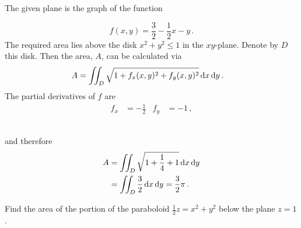 \begin{solution}
The given plane is the graph of the function \\
\begin{minipage}[c]{0.63\linewidth}
\[
f(x,y) = \frac 32 -\frac 12 x - y\,.
\]
The required area lies above the disk $x^2 + y^2 \leq 1$ in the $xy$-plane. Denote by $D$ this disk. Then the area, $A$, can be calculated via
\begin{align*}
A &= \iint_D \sqrt{1 + f_x(x,y)^2 + f_y(x,y)^2} \,\mathrm{d} x \,\mathrm{d} y\,.
\end{align*}
The partial derivatives of $f$ are
\begin{align*}
f_x &= -\frac 12 & f_y &= -1\,,
\end{align*}
\end{minipage}
\begin{minipage}[c]{0.35\linewidth}
\begin{center}
\end{center}
\end{minipage} \\
and therefore
\begin{align*}
A &= \iint_D \sqrt{1 + \frac 14 + 1} \,\mathrm{d} x \,\mathrm{d} y \\
&= \iint_D \frac 32 \,\mathrm{d} x \,\mathrm{d} y = \frac 32 \pi\,.
\end{align*}
\end{solution}

\begin{question}
Find the area of the portion of the paraboloid $\frac 12 z=x^2 + y^2$ below the plane $z=1$.
\end{question}

